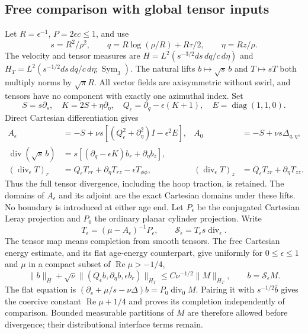 \subsection{Free comparison with global tensor inputs}

Let \(R=\epsilon^{-1}\), \(P=2\epsilon c\le1\), and use
\[
 s=R^2/\rho^2,\qquad q=R\log(\rho/R)+R\tau/2,
 \qquad \eta=Rz/\rho.
\]
The velocity and tensor measures are
\(H=L^2(s^{-3/2}ds\,dq/c\,d\eta)\) and
\(H_T=L^2(s^{-1/2}ds\,dq/c\,d\eta;\operatorname{Sym}_3)\).
The natural lifts \(b\mapsto\sqrt{s}\,b\) and \(T\mapsto sT\)
both multiply norms by \(\sqrt\pi R\). All vector fields are
axisymmetric without swirl, and tensors have no component with exactly
one azimuthal index. Set
\[
 S=s\partial_s,\quad K=2S+\eta\partial_\eta,\quad
 Q_\epsilon=\partial_q-\epsilon(K+1),\quad E=\operatorname{diag}(1,1,0).
\]
Direct Cartesian differentiation gives
\begin{align*}
 A_\epsilon&=-S+\nu s[(Q_\epsilon^2+\partial_\eta^2)I-\epsilon^2E],
 &A_0&=-S+\nu s\Delta_{q,\eta},\\
 \operatorname{div}(\sqrt{s}\,b)
 &=s[(\partial_q-\epsilon K)b_r+\partial_\eta b_z],\\
 (\operatorname{div}_\epsilon T)_r
 &=Q_\epsilon T_{rr}+\partial_\eta T_{rz}-\epsilon T_{\phi\phi},
 &(\operatorname{div}_\epsilon T)_z
 &=Q_\epsilon T_{zr}+\partial_\eta T_{zz}.
\end{align*}
Thus the full tensor divergence, including the hoop traction, is retained.
The domains of \(A_\epsilon\) and its adjoint are the exact Cartesian
domains under these lifts. No boundary is introduced at either age end.
Let \(P_\epsilon\) be the conjugated Cartesian Leray projection and
\(P_0\) the ordinary planar cylinder projection. Write
\[
 T_\epsilon=(\mu-A_\epsilon)^{-1}P_\epsilon,
 \qquad \mathcal S_\epsilon=T_\epsilon s\operatorname{div}_\epsilon.
\]
The tensor map means completion from smooth tensors. The free Cartesian
energy estimate, and its flat age-energy counterpart, give uniformly
for \(0\le\epsilon\le1\) and \(\mu\) in a compact subset of
\(\operatorname{Re}\mu>-1/4\),
\begin{equation}\label{near:free-energy}
 \|b\|_H+\sqrt\nu\|(Q_\epsilon b,\partial_\eta b,
                    \epsilon b_r)\|_{H_T}
 \le C\nu^{-1/2}\|M\|_{H_T},\qquad b=\mathcal S_\epsilon M.
\end{equation}
The flat equation is
\((\partial_s+\mu/s-\nu\Delta)b=P_0\operatorname{div}_0M\).
Pairing it with \(s^{-1/2}\bar b\) gives the coercive constant
\(\operatorname{Re}\mu+1/4\) and proves its completion independently
of comparison. Bounded measurable partitions of \(M\) are therefore
allowed before divergence; their distributional interface terms remain.


